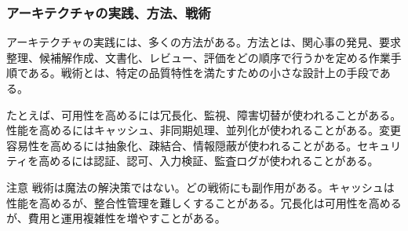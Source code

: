 \subsubsection{アーキテクチャの実践、方法、戦術}
アーキテクチャの実践には、多くの方法がある。方法とは、関心事の発見、要求整理、候補解作成、文書化、レビュー、評価をどの順序で行うかを定める作業手順である。戦術とは、特定の品質特性を満たすための小さな設計上の手段である。

たとえば、可用性を高めるには冗長化、監視、障害切替が使われることがある。性能を高めるにはキャッシュ、非同期処理、並列化が使われることがある。変更容易性を高めるには抽象化、疎結合、情報隠蔽が使われることがある。セキュリティを高めるには認証、認可、入力検証、監査ログが使われることがある。

\begin{statementbox}{注意}
戦術は魔法の解決策ではない。どの戦術にも副作用がある。キャッシュは性能を高めるが、整合性管理を難しくすることがある。冗長化は可用性を高めるが、費用と運用複雑性を増やすことがある。
\end{statementbox}
